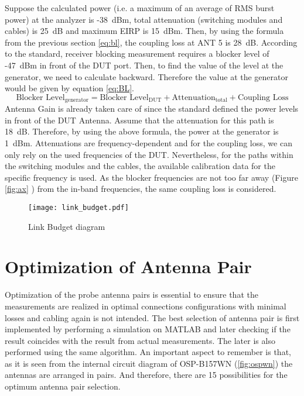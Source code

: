Suppose the calculated power (i.e. a maximum of an average of \acs{RMS} burst power) at the analyzer is -38~dBm, total attenuation (switching modules and cables) is 25~dB and maximum \acs{EIRP} is 15~dBm. Then, by using the formula from the previous section \ref{eq:bl}, the coupling loss at ANT 5 is 28~dB. According to the standard, receiver blocking measurement requires a blocker level of -47~dBm in front of the \acs{DUT} port. Then, to find the value of the level at the generator, we need to calculate backward. Therefore the value at the generator would be given by equation \ref{eq:BL}.
\begin{equation}
\mbox{Blocker Level}_{\mbox{generator}}  = \mbox{Blocker Level}_{\mbox{DUT}} + \mbox{Attenuation}_{\mbox{total}} + \mbox{Coupling Loss} \label{eq:BL}
\end{equation}
Antenna Gain is already taken care of since the standard defined the power levels in front of the \acs{DUT} Antenna. Assume that the attenuation for this path is 18~dB. Therefore, by using the above formula, the power at the generator is 1~dBm. Attenuations are frequency-dependent and for the coupling loss, we can only rely on the used frequencies of the \acs{DUT}. Nevertheless, for the paths within the switching modules and the cables, the available calibration data for the specific frequency is used. As the blocker frequencies are not too far away (Figure \ref{fig:ax} ) from the in-band frequencies, the same coupling loss is considered.

\begin{figure}[H]
\texttt{[image: link\_budget.pdf]}\vspace{-1.6cm}
\caption{Link Budget diagram}
\label{fig:link} 
\end{figure}



\section{Optimization of Antenna Pair} \label{sec:opti}
Optimization of the probe antenna pairs is essential to ensure that the measurements are realized in optimal connections configurations with minimal losses and cabling again is not intended. The best selection of antenna pair is first implemented by performing a simulation on MATLAB\textregistered{} and later checking if the result coincides with the result from actual measurements. The later is also performed using the same algorithm. An important aspect to remember is that, as it is seen from the internal circuit diagram of OSP-B157WN (\ref{fig:ospwn}) the antennas are arranged in pairs. And therefore, there are 15 possibilities for the optimum antenna pair selection.

